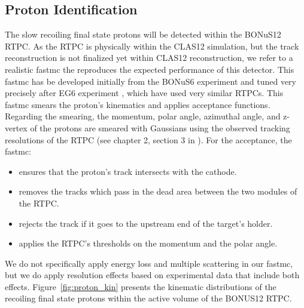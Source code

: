 \subsection{Proton Identification}
The slow recoiling final state protons will be detected within the BONuS12 
RTPC. As the RTPC is physically within the CLAS12 simulation, but the track 
reconstruction is not finalized yet within CLAS12 reconstruction, we refer to a 
realistic fastmc the reproduces the expected performance of this detector. This 
fastmc has be developed initially from the BONuS6 experiment and tuned very 
precisely after EG6 experiment \cite{eg6_note}, which have used very similar 
RTPCs.  This fastmc smears the proton's kinematics and applies acceptance 
functions. Regarding the smearing, the momentum, polar angle, azimuthal angle, 
and z-vertex of the protons are smeared with Gaussians using the observed 
tracking resolutions of the RTPC (see chapter 2, section 3 in \cite{eg6_note}).  
For the acceptance, the fastmc:
\begin{itemize}
   \item ensures that the proton's track intersects with the cathode.
   \item removes the tracks which pass in the dead area between the two modules 
      of the RTPC.
\item rejects the track if it goes to the upstream end of the target's holder.
\item applies the RTPC's thresholds on the momentum and the polar angle.
\end{itemize} 
We do not specifically apply energy loss and multiple scattering in our fastmc, 
but we do apply resolution effects based on experimental data that include both 
effects. Figure~\ref{fig:proton_kin} presents the kinematic distributions of 
the recoiling final state protons within the active volume of the BONUS12 RTPC. 


